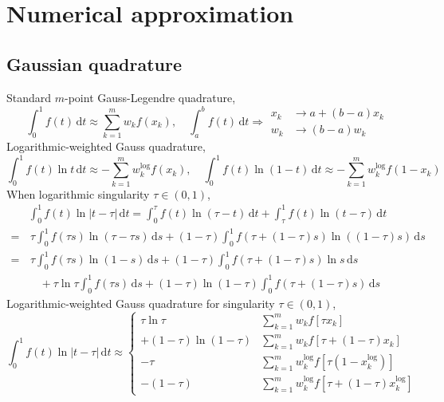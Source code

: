 \documentclass{jfm}
\begin{document}
\section{Numerical approximation}
\subsection{Gaussian  quadrature}
Standard $m$-point Gauss-Legendre quadrature,
\begin{equation}
\int_0^1 f(t)\,\mathrm{d}t\approx \sum_{k=1}^{m}w_k f(x_k),\quad
\int_a^b f(t)\,\mathrm{d}t\Rightarrow
\begin{aligned}
x_k&\to a+(b-a)x_k\\ w_k&\to (b-a)w_k
\end{aligned}
\end{equation}
Logarithmic-weighted Gauss quadrature,
\begin{equation}
\int_0^1 f(t) \ln t \,\mathrm{d}t\approx -\sum_{k=1}^{m}w_k^\mathrm{log} f(x_k),\quad
\int_0^1 f(t) \ln (1-t) \,\mathrm{d}t\approx -\sum_{k=1}^{m}w_k^\mathrm{log} f(1-x_k)
\end{equation}
When logarithmic singularity $\tau\in (0,1)$,
\begin{align*}
&\int_0^1 f(t) \ln |t-\tau|\,\mathrm{d}t 
=\int_0^\tau f(t) \ln (\tau - t)\,\mathrm{d}t+\int_\tau^1 f(t) \ln (t-\tau)\,\mathrm{d}t\\
=&\,\tau\int_0^1 f(\tau s) \ln (\tau - \tau s)\,\mathrm{d}s
+(1-\tau) \int_0^1 f(\tau + (1-\tau) s) \ln ( (1-\tau) s)\,\mathrm{d}s\\
=&\,\tau\int_0^1 f(\tau s) \ln (1 - s)\,\mathrm{d} s
+(1-\tau) \int_0^1 f(\tau + (1-\tau) s) \ln s\,\mathrm{d}s\\
&\quad+\tau\ln\tau\int_0^1 f(\tau s) \,\mathrm{d} s
+(1-\tau)\ln (1-\tau) \int_0^1 f(\tau + (1-\tau) s) \,\mathrm{d}s
\end{align*}
Logarithmic-weighted Gauss quadrature for singularity $\tau\in (0,1)$,
\begin{equation}\int_0^1 f(t) \ln |t-\tau|\,\mathrm{d}t 
\approx\left\{ 
\begin{aligned}
\tau\ln\tau &\sum_{k=1}^m w_k f\left[\tau x_k\right] \\
+ (1- \tau)\ln(1-\tau) &\sum_{k=1}^m w_k f\left[\tau + (1-\tau)x_k\right]\\
- \tau &\sum_{k=1}^m w_k^\mathrm{log} f\left[\tau(1 -x_k^\mathrm{log})\right]\\
- (1- \tau) &\sum_{k=1}^m w_k^\mathrm{log} f\left[\tau + (1-\tau)x_k^\mathrm{log}\right]
\end{aligned}\right.
\end{equation}
\end{document}
